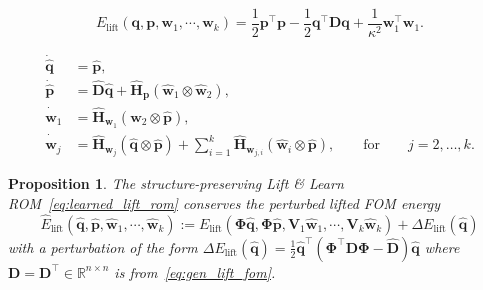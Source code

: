 \documentclass[10pt,a4paper]{amsart}
\newtheorem{proposition}{Proposition}
\newcommand{\D}{\mathbf D}
\newcommand{\Dhat}{\widehat{\D}}
\newcommand{\Hhat}{\widehat{\mathbf H}}
\newcommand{\V}{\mathbf V}
\newcommand{\bPhi}{\mathbf{\Phi}}
\newcommand{\p}{\mathbf p}
\newcommand{\phat}{\widehat{\p}}
\newcommand{\q}{\mathbf q}
\newcommand{\qhat}{\widehat{\q}}
\newcommand{\real}{\mathbb{R}}
\newcommand{\w}{\mathbf w}
\newcommand{\what}{\widehat{\w}}
\begin{document}
\begin{equation}
\label{eq: lift_energy}
E_{\text{lift}}(\q,\p,\w_1, \cdots,\w_{k})=\frac{1}{2}\p^\top\p - \frac{1}{2}\q^\top \D\q +\frac{1}{\kappa^2} \w_1^\top\w_1. 
\end{equation}

\begin{align} 
\label{eq:learned_lift_rom}
    \dot{\qhat}&=\phat,\nonumber \\
    \dot{\phat}&=\Dhat\qhat + \Hhat_{\p}(\what_1\otimes\what_2) ,\nonumber \\
    \dot{\what}_1&=\Hhat_{\w_1}(\what_2\otimes\phat),\\
        \dot{\what}_j&=\Hhat_{\w_j}(\qhat\otimes\phat) + \sum_{i=1}^k\Hhat_{\w_{j,i}}(\what_i\otimes \phat),  \qquad \text{for} \qquad j=2, \ldots,k. \nonumber 
    \end{align}

\begin{proposition} The structure-preserving Lift \& Learn ROM~\eqref{eq:learned_lift_rom} conserves the perturbed lifted FOM energy 
\begin{equation}
\label{eq:pertrubed_energy}
\widehat{E}_{\mathrm{lift}}(\qhat,\phat,\what_1, \cdots,  \what_{k}):=E_{\mathrm{lift}}(\bPhi\qhat,\bPhi\phat,\V_{1}\what_1, \cdots,\V_{k}\what_{k}) + \Delta E_{\mathrm{lift}}(\qhat)
\end{equation}
with a perturbation of the form $\Delta E_{\mathrm{lift}}(\qhat)=\frac{1}{2}\qhat^\top (\bPhi^\top\D\bPhi-\Dhat)\qhat$ where $\D=\D^\top \in \real^{n \times n}$ is from~\eqref{eq:gen_lift_fom}.
\end{proposition}
\end{document}
